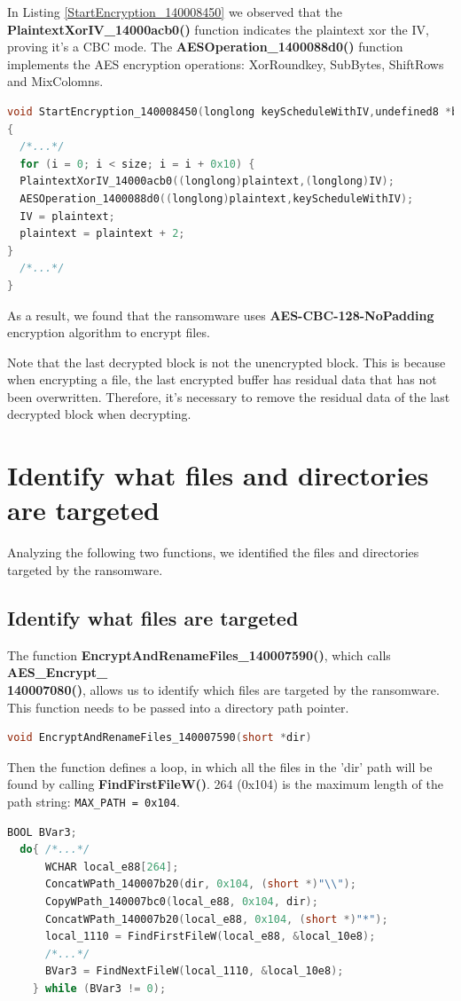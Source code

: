 \documentclass[11pt]{article}
\begin{document}
In Listing \ref{StartEncryption_140008450} we observed that the \textbf{PlaintextXorIV\_14000acb0()} function indicates the plaintext xor the IV, proving it's a CBC mode. The \textbf{AESOperation\_1400088d0()} function implements the AES encryption operations: XorRoundkey, SubBytes, ShiftRows and MixColomns.

\begin{lstlisting}[language=c++, caption=Part of StartEncryption\_140008450, label=StartEncryption_140008450]
void StartEncryption_140008450(longlong keyScheduleWithIV,undefined8 *buffer,uint size)
{
  /*...*/
  for (i = 0; i < size; i = i + 0x10) {
  PlaintextXorIV_14000acb0((longlong)plaintext,(longlong)IV);
  AESOperation_1400088d0((longlong)plaintext,keyScheduleWithIV);
  IV = plaintext;
  plaintext = plaintext + 2;
}
  /*...*/
}
\end{lstlisting}

As a result, we found that the ransomware uses \textbf{AES-CBC-128-NoPadding} encryption algorithm to encrypt files.

Note that the last decrypted block is not the unencrypted block. This is because when encrypting a file, the last encrypted buffer has residual data that has not been overwritten. Therefore, it's necessary to remove the residual data of the last decrypted block when decrypting.

\section{Identify what files and directories are targeted}
Analyzing the following two functions, we identified the files and directories targeted by the ransomware.

\subsection{Identify what files are targeted}
The function \textbf{EncryptAndRenameFiles\_140007590()}, which calls \textbf{AES\_Encrypt\_\\140007080()}, allows us to identify which files are targeted by the ransomware. This function needs to be passed into a directory path pointer.
\begin{lstlisting}[language=c++]
void EncryptAndRenameFiles_140007590(short *dir)
\end{lstlisting}

Then the function defines a loop, in which all the files in the 'dir' path will be found by calling \textbf{FindFirstFileW()}. 264 (0x104) is the maximum length of the path string: \lstinline|MAX_PATH = 0x104|.
\begin{lstlisting}[language=c++]
  BOOL BVar3;
  do{ /*...*/
      WCHAR local_e88[264];
      ConcatWPath_140007b20(dir, 0x104, (short *)"\\");
      CopyWPath_140007bc0(local_e88, 0x104, dir);
      ConcatWPath_140007b20(local_e88, 0x104, (short *)"*");
      local_1110 = FindFirstFileW(local_e88, &local_10e8);
      /*...*/
      BVar3 = FindNextFileW(local_1110, &local_10e8);
    } while (BVar3 != 0);
\end{lstlisting}
\end{document}

